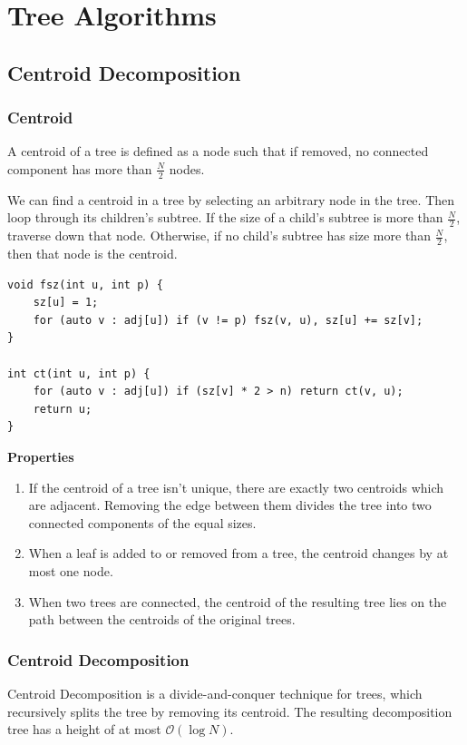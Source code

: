\documentclass[12pt,a4paper]{article}
\begin{document}
\break

\section{Tree Algorithms}
\subsection{Centroid Decomposition}
\subsubsection{Centroid}
A centroid of a tree is defined as a node such that if removed, no connected component has  more than $\frac{N}{2}$ nodes.

We can find a centroid in a tree by selecting an arbitrary node in the tree. Then loop through its children's subtree. If the size of a child's subtree is more than $\frac{N}{2}$, traverse down that node. Otherwise, if no child's subtree has size more than $\frac{N}{2}$, then that node is the centroid.

\begin{lstlisting}
void fsz(int u, int p) {
    sz[u] = 1;
    for (auto v : adj[u]) if (v != p) fsz(v, u), sz[u] += sz[v];
}

int ct(int u, int p) {
    for (auto v : adj[u]) if (sz[v] * 2 > n) return ct(v, u);
    return u;
}
\end{lstlisting}

\noindent\textbf{Properties}
\begin{enumerate}
    \item If the centroid of a tree isn't unique, there are exactly two centroids which are adjacent. Removing the edge between them divides the tree into two connected components of the equal sizes.
    \item When a leaf is added to or removed from a tree, the centroid changes by at most one node.
    \item When two trees are connected, the centroid of the resulting tree lies on the path between the centroids of the original trees.
\end{enumerate}

\subsubsection{Centroid Decomposition}

Centroid Decomposition is a divide-and-conquer technique for trees, which recursively splits the tree by removing its centroid. The resulting decomposition tree has a height of at most $\mathcal{O}(\log N)$.
\end{document}
